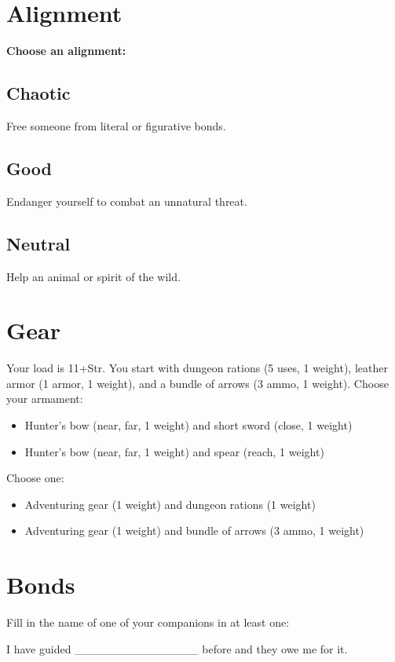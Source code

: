 \section*{Alignment}

{\bfseries Choose an alignment:}
\subsection{Chaotic}

Free someone from literal or figurative bonds.
\subsection{Good}

Endanger yourself to combat an unnatural threat.
\subsection{Neutral}

Help an animal or spirit of the wild.
\section*{Gear}

Your load is 11+Str. You start with dungeon rations (5 uses, 1 weight), leather armor (1 armor, 1 weight), and a bundle of arrows (3 ammo, 1 weight). Choose your armament:
\begin{itemize}
\item Hunter's bow (near, far, 1 weight) and short sword (close, 1 weight)
\item Hunter's bow (near, far, 1 weight) and spear (reach, 1 weight)

\end{itemize}

Choose one:
\begin{itemize}
\item Adventuring gear (1 weight) and dungeon rations (1 weight)
\item Adventuring gear (1 weight) and bundle of arrows (3 ammo, 1 weight)

\end{itemize}
\section*{Bonds}

Fill in the name of one of your companions in at least one:

I have guided \_\_\_\_\_\_\_\_\_\_\_\_\_\_\_ before and they owe me for it.

